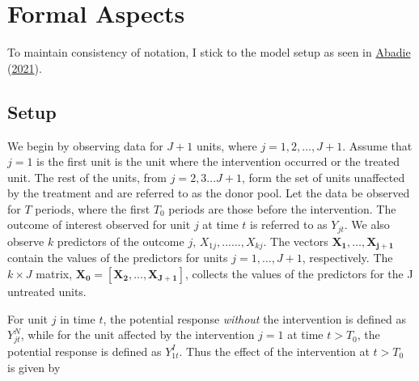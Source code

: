 \documentclass[12pt,nobind, a4paper]{reedthesis}
\begin{document}
 \hypertarget{formal-aspects}{%
 \section{Formal Aspects}\label{formal-aspects}}

 To maintain consistency of notation, I stick to the model setup as seen in \protect\hyperlink{ref-abadie_using_2021}{Abadie} (\protect\hyperlink{ref-abadie_using_2021}{2021}).

 \hypertarget{setup}{%
 \subsection{Setup}\label{setup}}

 We begin by observing data for \(J+1\) units, where \(j=1,2,...,J+1\). Assume that \(j=1\) is the first unit is the unit where the intervention occurred or the treated unit. The rest of the units, from \(j=2,3...J+1\), form the set of units unaffected by the treatment and are referred to as the donor pool. Let the data be observed for \(T\) periods, where the first \(T_0\) periods are those before the intervention. The outcome of interest observed for unit \(j\) at time \(t\) is referred to as \(Y_{jt}\). We also observe \(k\) predictors of the outcome \(j\), \(X_{1j},......,X_{kj}\). The vectors \(\mathbf{X_{1},…,X_{j+1}}\) contain the values of the predictors for units \(j = 1,…,J + 1\), respectively. The \(k \times J\) matrix, \(\mathbf{X_{0}} = [\mathbf{X_{2}},..., \mathbf{X_{J+1}}]\), collects the values of the predictors for the J untreated units.
 \linebreak

 For unit \(j\) in time \(t\), the potential response \emph{without} the intervention is defined as \(Y^{N}_{jt}\), while for the unit affected by the intervention \(j=1\) at time \(t>T_0\), the potential response is defined as \(Y^{I}_{1t}\). Thus the effect of the intervention at \(t>T_0\) is given by
\end{document}
